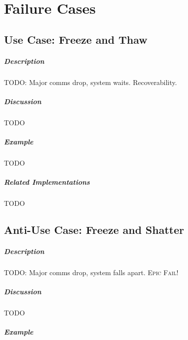 \chapter{Failure Cases}

\section{Use Case: Freeze and Thaw}

\paragraph{Description}

{\Large TODO:} Major comms drop, system waits. Recoverability.

\paragraph{Discussion}

{\Large TODO}

\paragraph{Example}

{\Large TODO}

\paragraph{Related Implementations}

{\Large TODO}

\section{Anti-Use Case: Freeze and Shatter}

\paragraph{Description}

{\Large TODO:} Major comms drop, system falls apart. \textsc{Epic Fail}!

\paragraph{Discussion}

{\Large TODO}

\paragraph{Example}

